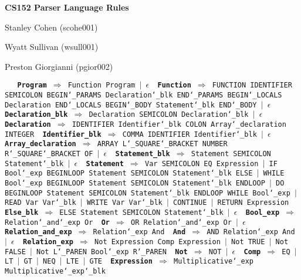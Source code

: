 \documentclass{article}
\begin{document}
 
 
\centerline{\large \bf CS152 Parser Language Rules}
\centerline{Stanley Cohen (scohe001)}
\centerline{Wyatt Sullivan (wsull001)}
\centerline{Preston Giorgianni (pgior002)}

\texttt{
\
{\vskip 0.1in \noindent\bf Program} $\Rightarrow$ 
        Function Program $|$ $\epsilon$
{\vskip 0.1in \noindent\bf Function} $\Rightarrow$ 
        FUNCTION IDENTIFIER SEMICOLON BEGIN\char`_PARAMS Declaration\char`_blk 
        END\char`_PARAMS BEGIN\char`_LOCALS Declaration END\char`_LOCALS BEGIN\char`_BODY 
        Statement\char`_blk END\char`_BODY $|$ $\epsilon$
\
{\vskip 0.1in \noindent\bf Declaration\_blk} $\Rightarrow$ 
    Declaration SEMICOLON Declaration\char`_blk $|$ $\epsilon$
{\vskip 0.1in \noindent\bf Declaration} $\Rightarrow$ 
    IDENTIFIER Identifier\char`_blk COLON Array\char`_declaration INTEGER
{\vskip 0.1in \noindent\bf Identifier\_blk} $\Rightarrow$ 
    COMMA IDENTIFIER Identifier\char`_blk $|$ $\epsilon$
{\vskip 0.1in \noindent\bf Array\_declaration} $\Rightarrow$ 
    ARRAY L\char`_SQUARE\char`_BRACKET NUMBER R\char`_SQUARE\char`_BRACKET OF $|$ $\epsilon$
{\vskip 0.1in \noindent\bf Statement\_blk} $\Rightarrow$ 
    Statement SEMICOLON Statement\char`_blk $|$ $\epsilon$
{\vskip 0.1in \noindent\bf Statement} $\Rightarrow$ 
    Var SEMICOLON EQ Expression $|$ IF Bool\char`_exp BEGINLOOP Statement SEMICOLON Statement\char`_blk ELSE $|$ WHILE Bool\char`_exp BEGINLOOP Statement SEMICOLON Statement\char`_blk ENDLOOP $|$ DO BEGINLOOP Statement SEMICOLON Statement\char`_blk ENDLOOP WHILE Bool\char`_exp $|$ READ Var Var\char`_blk $|$ WRITE Var Var\char`_blk $|$ CONTINUE $|$ RETURN Expression
{\vskip 0.1in \noindent\bf Else\_blk} $\Rightarrow$ 
    ELSE Statement SEMICOLON Statement\char`_blk $|$ $\epsilon$
{\vskip 0.1in \noindent\bf Bool\_exp} $\Rightarrow$ 
    Relation\char`_and\char`_exp Or
{\vskip 0.1in \noindent\bf Or} $\Rightarrow$ 
    OR Relation\char`_and\char`_exp Or $|$ $\epsilon$
{\vskip 0.1in \noindent\bf Relation\_and\_exp} $\Rightarrow$ 
    Relation\char`_exp And
{\vskip 0.1in \noindent\bf And} $\Rightarrow$ 
    AND Relation\char`_exp And $|$ $\epsilon$
{\vskip 0.1in \noindent\bf Relation\_exp} $\Rightarrow$ 
    Not Expression Comp Expression $|$ Not TRUE $|$ Not FALSE $|$ Not L\char`_PAREN Bool\char`_exp R\char`_PAREN
{\vskip 0.1in \noindent\bf Not} $\Rightarrow$ 
    NOT $|$ $\epsilon$
{\vskip 0.1in \noindent\bf Comp} $\Rightarrow$ 
    EQ $|$ LT $|$ GT $|$ NEQ $|$ LTE $|$ GTE
{\vskip 0.1in \noindent\bf Expression} $\Rightarrow$ 
    Multiplicative\char`_exp Multiplicative\char`_exp\char`_blk
}
\end{document}
